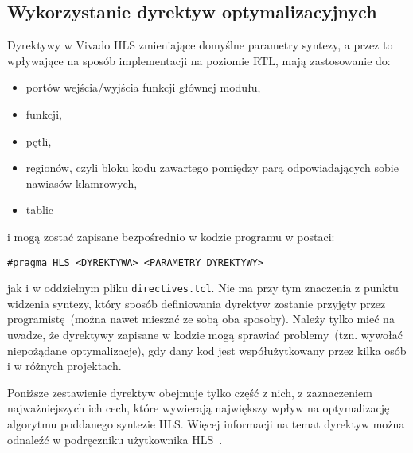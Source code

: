 \subsection{Wykorzystanie dyrektyw optymalizacyjnych}
Dyrektywy w Vivado HLS zmieniające domyślne parametry syntezy, a przez to wpływające na sposób implementacji na poziomie RTL, mają zastosowanie do:
\begin{itemize}
\item portów wejścia/wyjścia funkcji głównej modułu,
\item funkcji,
\item pętli,
\item regionów, czyli bloku kodu zawartego pomiędzy parą odpowiadających sobie nawiasów klamrowych,
\item tablic
\end{itemize}
i mogą zostać zapisane bezpośrednio w kodzie programu w postaci:
\begin{lstlisting}
#pragma HLS <DYREKTYWA> <PARAMETRY_DYREKTYWY>
\end{lstlisting}
jak i w oddzielnym pliku \texttt{directives.tcl}. Nie ma przy tym znaczenia z punktu widzenia syntezy, który sposób definiowania dyrektyw zostanie przyjęty przez programistę~(można nawet mieszać ze sobą oba sposoby). Należy tylko mieć na uwadze, że dyrektywy zapisane w kodzie mogą sprawiać problemy~(tzn. wywołać niepożądane optymalizacje), gdy dany kod jest współużytkowany przez kilka osób i w różnych projektach.

Poniższe zestawienie dyrektyw obejmuje tylko część z nich, z zaznaczeniem najważniejszych ich cech, które wywierają największy wpływ na optymalizację algorytmu poddanego syntezie HLS. Więcej informacji na temat dyrektyw można odnaleźć w podręczniku użytkownika HLS~\cite{UG902}.

